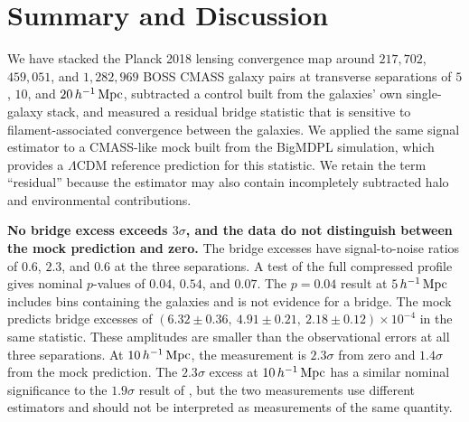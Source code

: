 %

\section{Summary and Discussion}
\label{sec:discussion}

We have stacked the Planck 2018 lensing convergence map around $217{,}702$,
$459{,}051$, and $1{,}282{,}969$ BOSS CMASS galaxy pairs at transverse
separations of $5$, $10$, and $20\,h^{-1}\,{\rm Mpc}$,
subtracted a control built from the galaxies' own single-galaxy stack, and
measured a residual bridge statistic that is sensitive to filament-associated
convergence between the galaxies. We applied the same signal estimator to a
CMASS-like mock built from the BigMDPL simulation, which provides a
$\Lambda$CDM reference prediction for this statistic. We retain the term
``residual'' because the estimator may also contain incompletely subtracted
halo and environmental contributions.

\textbf{No bridge excess exceeds $3\sigma$, and the data do not distinguish
between the mock prediction and zero.} The bridge excesses have
signal-to-noise ratios of $0.6$, $2.3$, and $0.6$ at the three separations. A
test of the full compressed profile gives nominal $p$-values of $0.04$,
$0.54$, and $0.07$.
The $p=0.04$ result at $5\,h^{-1}\,{\rm Mpc}$ includes bins containing the galaxies and
is not evidence for a bridge. The mock predicts bridge excesses of
$\left(6.32\pm0.36,\ 4.91\pm0.21,\ 2.18\pm0.12\right)\times10^{-4}$ in the
same statistic. These amplitudes are smaller than the observational errors
at all three separations. At $10\,h^{-1}\,{\rm Mpc}$, the measurement is $2.3\sigma$
from zero and $1.4\sigma$ from the mock prediction.
The $2.3\sigma$ excess at $10\,h^{-1}\,{\rm Mpc}$ has a similar nominal significance
to the $1.9\sigma$ result of \citet{deGraaff2019}, but the two measurements
use different estimators and should not be interpreted as measurements of
the same quantity.

